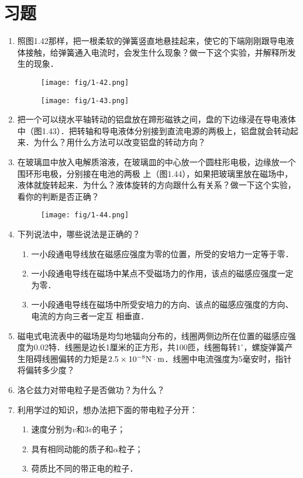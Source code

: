 \section*{习题}
\begin{enumerate}
    \item 照图1.42那样，把一根柔软的弹簧竖直地悬挂起来，使它的下端刚刚跟导电液体接触，给弹簧通入电流时，会发生什么现象？做一下这个实验，并解释所发生的现象．

\begin{figure}[htp]
\centering
\begin{minipage}[t]{0.48\textwidth}
\centering
    	\texttt{[image: fig/1-42.png]}
\caption{}
\end{minipage}
\begin{minipage}[t]{0.48\textwidth}
\centering
	\texttt{[image: fig/1-43.png]}
\caption{}
\end{minipage}
\end{figure}

    \item 把一个可以绕水平轴转动的铝盘放在蹄形磁铁之间，盘的下边缘浸在导电液体中（图1.43）．把转轴和导电液体分别接到直流电源的两极上，铝盘就会转动起来．为什么？用什么方法可以改变铝盘的转动方向？
\item 在玻璃皿中放入电解质溶液，在玻璃皿的中心放一个圆柱形电极，边缘放一个围环形电极，分别接在电池的两极
上（图1.44），如果把玻璃里放在磁场中，液体就旋转起来．为什么？液体旋转的方向跟什么有关系？做一下这个实验，看你的判断是否正确？
\begin{figure}[htp]\centering
	\texttt{[image: fig/1-44.png]}
	\caption{ }
\end{figure}
\item 下列说法中，哪些说法是正确的？
\begin{enumerate}
    \item 一小段通电导线放在磁感应强度为零的位置，所受的安培力一定等于零．
    \item 一小段通电导线在磁场中某点不受磁场力的作用，该点的磁感应强度一定为零．
    \item 一小段通电导线在磁场中所受安培力的方向、该点的磁感应强度的方向、电流的方向三者一定互
相垂直．
\end{enumerate}

\item 磁电式电流表中的磁场是均匀地辐向分布的，线圈两侧边所在位置的磁感应强度为0.02特．线圈是边长1厘米的正方形，共100匝，线圈每转$1^{\circ}$，螺旋弹簧产生阻碍线圈偏转的力矩是$2.5\times10^{-8}{\rm N}\cdot {\rm m}$．线圈中电流强度为5毫安时，指针将偏转多少度？
\item 洛仑兹力对带电粒子是否做功？为什么？    
\item 利用学过的知识，想办法把下面的带电粒子分开：
\begin{enumerate}
    \item 速度分别为$v$和$3v$的电子；
    \item 具有相同动能的质子和$\alpha$粒子；
    \item 荷质比不同的带正电的粒子．
\end{enumerate}


\end{enumerate}
